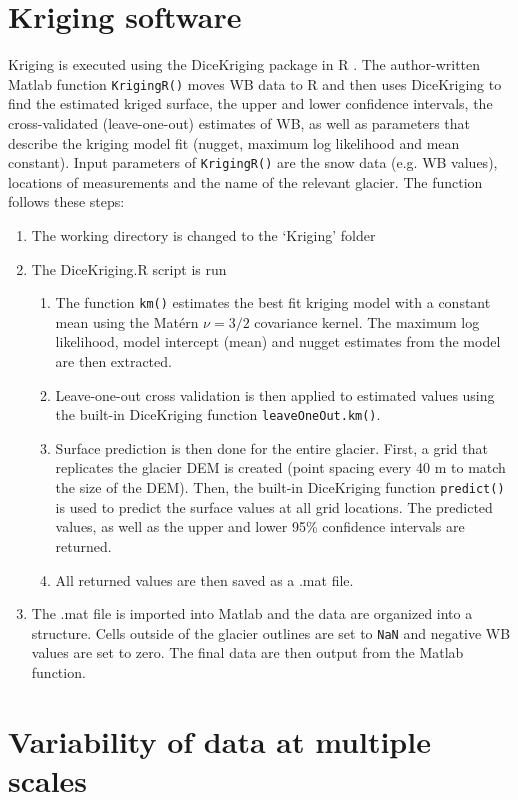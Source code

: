 \documentclass{sfuthesis}
\begin{document}
{\begin{appendices}
\chapter{Kriging software}
\label{app:KrigingMethods}
Kriging is executed using the DiceKriging package in R \citep{Roustant2012}. The author-written Matlab function \texttt{KrigingR()} moves WB data to R and then uses DiceKriging to find the estimated kriged surface, the upper and lower confidence intervals, the cross-validated (leave-one-out) estimates of WB, as well as parameters that describe the kriging model fit (nugget, maximum log likelihood and mean constant). Input parameters of  \texttt{KrigingR()} are the snow data (e.g. WB values), locations of measurements and the name of the relevant glacier. The function follows these steps:
\begin{enumerate}
\item The working directory is changed to the `Kriging' folder
\item The DiceKriging.R script is run
	\begin{enumerate}
	\item The function \texttt{km()} estimates the best fit kriging model with a constant mean using the Mat\'ern $\nu = 3/2$ covariance kernel. The maximum log likelihood, model intercept (mean) and nugget estimates from the model are then extracted. 
	\item Leave-one-out cross validation is then applied to estimated values using the built-in DiceKriging function \texttt{leaveOneOut.km()}.
	\item Surface prediction is then done for the entire glacier. First, a grid that replicates the glacier DEM is created (point spacing every 40 m to match the size of the DEM). Then, the built-in DiceKriging function \texttt{predict()} is used to predict the surface values at all grid locations. The predicted values, as well as the upper and lower 95\% confidence intervals are returned. 
	\item All returned values are then saved as a .mat file.
	\end{enumerate}
\item The .mat file is imported into Matlab and the data are organized into a structure. Cells outside of the glacier outlines are set to \texttt{NaN} and negative WB values are set to zero. The final data are then output from the Matlab function. 
\end{enumerate}

\chapter{Variability of data at multiple scales}
\label{app:variability_data_multiple_scales}


\end{appendices}}
\end{document}
